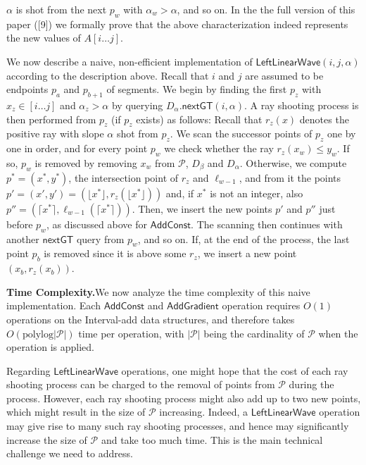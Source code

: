 \documentclass[11pt]{article}
\newcommand{\Pset}{\mathcal{P}}
\newcommand{\Lwave}{\ensuremath{\mathsf{LeftLinearWave}}}
\newcommand{\AddConst}{\ensuremath{\mathsf{AddConst}}}
\newcommand{\AddGrad}{\ensuremath{\mathsf{AddGradient}}}
\newcommand{\nextGT}{\ensuremath{\mathsf{nextGT}}}
\newcommand{\poly}{\ensuremath{\mathrm{polylog}}}
\begin{document}
\bigskip


$\alpha$ is shot from the next $p_w$ with $\alpha_w > \alpha$, and so on. In the the full version of this paper
([9]) we formally prove that the above characterization indeed represents the new values of
$A[i \ldots j]$.

We now describe a naive, non-efficient implementation of \Lwave$(i,j,\alpha)$ according
to the description above. Recall that $i$ and $j$ are assumed to be endpoints $p_a$ and $p_{b+1}$
of segments. We begin by finding the first $p_z$ with $x_z \in [i \ldots j]$ and $\alpha_z > \alpha$ by querying
$D_\alpha.\nextGT(i,\alpha)$. A ray shooting process is then performed from $p_z$ (if $p_z$ exists) as follows:
Recall that $r_z(x)$ denotes the positive ray with slope $\alpha$ shot from $p_z$. We scan the successor
points of $p_z$ one by one in order, and for every point $p_w$ we check whether the ray $r_z(x_w) \le y_w$.
If so, $p_w$ is removed by removing $x_w$ from $\Pset$, $D_\beta$ and $D_\alpha$. Otherwise, we compute $p^* = (x^*, y^*)$,
the intersection point of $r_z$ and $\ell_{w-1}$, and from it the points $p' = (x', y') = (\lfloor x^* \rfloor, r_z(\lfloor x^* \rfloor))$
and, if $x^*$ is not an integer, also $p'' = (\lceil x^* \rceil, \ell_{w-1}(\lceil x^* \rceil))$. Then, we insert the new points $p'$
and $p''$ just before $p_w$, as discussed above for \AddConst. The scanning then continues with
another \nextGT{} query from $p_w$, and so on. If, at the end of the process, the last point $p_b$ is
removed since it is above some $r_z$, we insert a new point $(x_b, r_z(x_b))$.

\smallskip
\noindent\textbf{Time Complexity.}\quad We now analyze the time complexity of this naive implementation.
Each \AddConst{} and \AddGrad{} operation requires $O(1)$ operations on the Interval-add
data structures, and therefore takes $O(\poly|\Pset|)$ time per operation, with $|\Pset|$ being the
cardinality of $\Pset$ when the operation is applied.

Regarding \Lwave{} operations, one might hope that the cost of each ray shooting
process can be charged to the removal of points from $\Pset$ during the process. However, each
ray shooting process might also add up to two new points, which might result in the size of
$\Pset$ increasing. Indeed, a \Lwave{} operation may give rise to many such ray shooting
processes, and hence may significantly increase the size of $\Pset$ and take too much time. This
is the main technical challenge we need to address.
\end{document}
